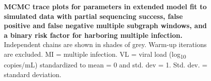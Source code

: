 \documentclass[10pt,letterpaper]{article}
\begin{document}
\begin{figure}[!ht]
\caption{{\bf MCMC trace plots for parameters in extended model fit to simulated data with partial sequencing success, false positive and false negative multiple subgraph windows, and a binary risk factor for harboring multiple infection.} Independent chains are shown in shades of grey. Warm-up iterations are excluded. MI = multiple infection. VL = viral load (log\textsubscript{10} copies/mL) standardized to mean = 0 and std. dev = 1. Std. dev. = standard deviation.  }
\end{figure}
\end{document}
